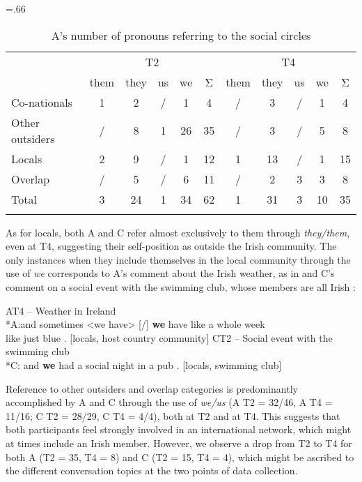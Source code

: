\documentclass[output=paper]{langscibook}
\begin{document}
\begin{table}\tabcolsep=.66\tabcolsep%
\begin{tabular}{lcccccccccc}
\lsptoprule
& \multicolumn{5}{c}{{T2}} & \multicolumn{5}{c}{{T4}}\\\cmidrule(lr){2-6}\cmidrule(lr){7-11}
& {them} & {they} & {us} & {we} & {Σ} & {them} & {they} & {us} & {we} & {Σ}\\\midrule
{Co-nationals}    & 1 & 2 & / & 1 & 4 & / & 3 & / & 1 & 4\\
{Other outsiders} & / & 8 & 1 & 26 & 35 & / & 3 & / & 5 & 8\\
{Locals} & 2 & 9 & / & 1 & 12 & 1 & 13 & / & 1 & 15\\
{Overlap} & / & 5 & / & 6 & 11 & / & 2 & 3 & 3 & 8\\\addlinespace
{Total} & 3 & 24 & 1 & 34 & 62 & 1 & 31 & 3 & 10 & 35\\
\lspbottomrule
\end{tabular}
\caption{A’s number of pronouns referring to the social circles\label{tab:saddour:11}}
\end{table}

As for locals, both A and C refer almost exclusively to them through \textit{they/them}, even at T4, suggesting their self-position as outside the Irish community. The only instances when they include themselves in the local community through the use of \textit{we} corresponds to A’s comment about the Irish weather, as in  and C’s comment on a social event with the swimming club, whose members are all Irish :

\ea%
    \label{ex:16}
    AT4 – Weather in Ireland\medskip\\
*A:\tab and sometimes <we have> [/] \textbf{we} have like a whole week\\ \tab like just blue . [locals, host country community]
\ex%
    \label{ex:17}
   CT2 – Social event with the swimming club\medskip\\
*C: \tab and \textbf{we} had a social night in a pub . [locals, swimming club]
\z

Reference to other outsiders and overlap categories is predominantly accomplished by A and C through the use of \textit{we/us} (A T2 = 32/46, A T4 = 11/16; C T2 = 28/29, C T4 = 4/4), both at T2 and at T4. This suggests that both participants feel strongly involved in an international network, which might at times include an Irish member. However, we observe a drop from T2 to T4 for both A (T2 = 35, T4 = 8) and C (T2 = 15, T4 = 4), which might be ascribed to the different conversation topics at the two points of data collection.
\end{document}
